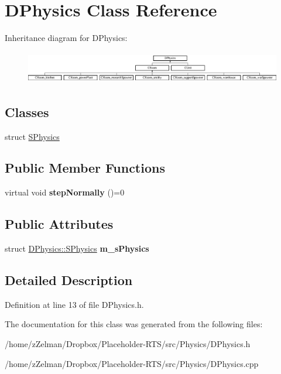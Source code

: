 \hypertarget{classDPhysics}{\section{D\-Physics Class Reference}
\label{classDPhysics}
}
Inheritance diagram for D\-Physics\-:\begin{figure}[H]
\begin{center}
\leavevmode
\includegraphics[height=1.428571cm]{classDPhysics}
\end{center}
\end{figure}
\subsection*{Classes}
\begin{DoxyCompactItemize}
\item 
struct \hyperlink{structDPhysics_1_1SPhysics}{S\-Physics}
\end{DoxyCompactItemize}
\subsection*{Public Member Functions}
\begin{DoxyCompactItemize}
\item 
\hypertarget{classDPhysics_a414316ffcec06dbf01ced086bbb92b55}{virtual void {\bfseries step\-Normally} ()=0}\label{classDPhysics_a414316ffcec06dbf01ced086bbb92b55}

\end{DoxyCompactItemize}
\subsection*{Public Attributes}
\begin{DoxyCompactItemize}
\item 
\hypertarget{classDPhysics_aca2940879481f0e2b892c82c5fc0da5a}{struct \hyperlink{structDPhysics_1_1SPhysics}{D\-Physics\-::\-S\-Physics} {\bfseries m\-\_\-s\-Physics}}\label{classDPhysics_aca2940879481f0e2b892c82c5fc0da5a}

\end{DoxyCompactItemize}


\subsection{Detailed Description}


Definition at line 13 of file D\-Physics.\-h.



The documentation for this class was generated from the following files\-:\begin{DoxyCompactItemize}
\item 
/home/z\-Zelman/\-Dropbox/\-Placeholder-\/\-R\-T\-S/src/\-Physics/D\-Physics.\-h\item 
/home/z\-Zelman/\-Dropbox/\-Placeholder-\/\-R\-T\-S/src/\-Physics/D\-Physics.\-cpp\end{DoxyCompactItemize}
